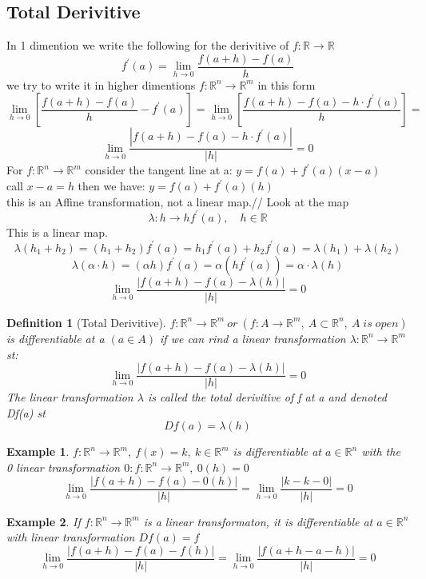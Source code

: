 \documentclass[12pt]{article}
\def\RR{\mathbb{R}}
\newtheorem{definition}{Definition}[section]
\newtheorem{example}{Example}[section]
\begin{document}
\subsection{Total Derivitive}


In 1 dimention we write the following for the derivitive of $f:\RR \rightarrow \RR$
\[f^{'}(a)=\lim_{h \to 0}\frac{f(a+h) - f(a)}{h}\]
we try to write it in higher dimentions $f:\RR^{n} \rightarrow \RR^{m}$ in this form
\[\lim_{h \to 0}\left[\frac{f(a+h) - f(a)}{h} - f^{'}(a)\right]=\lim_{h \to 0}\left[\frac{f(a+h) - f(a) - h \cdot f^{'}(a)}{h}\right]=\] 
\[\lim_{h \to 0}\frac{|f(a+h) - f(a) - h \cdot f^{'}(a)|}{|h|} =0 \]
For $f:\RR^{n} \rightarrow \RR^{m}$ consider the tangent line at a: $y=f(a) +f^{'}(a)(x-a)$\\
call $x-a = h$ then we have: $y=f(a) +f^{'}(a)(h)$\\
this is an Affine transformation, not a linear map.//
Look at the map
\[\lambda:h \rightarrow hf^{'}(a), \quad h \in \RR\]
This is a linear map.
\[\lambda(h_{1} + h_{2})=(h_{1} + h_{2})f^{'}(a)= h_{1}f^{'}(a) + h_{2}f^{'}(a) =\lambda(h_{1}) + \lambda(h_{2})\]
\[\lambda(\alpha \cdot h)=(\alpha h)f^{'}(a)=\alpha(hf^{'}(a))=\alpha \cdot\lambda( h)\]
\[\lim_{h \to 0}\frac{|f(a+h) - f(a) - \lambda(h)|}{|h|} =0 \]

\begin{definition}[Total Derivitive]\label{D:Total Derivitive}
$f:\RR^{n} \rightarrow \RR^{m}\: or \:(f:A \rightarrow \RR^{m}, \: A \subset \RR^{n}, \:A\;is\;open)$
is differentiable at a $(a \in A)$ if we can rind a linear transformation $ \lambda:\RR^{n} \rightarrow \RR^{m}$ st:
\[\lim_{h \to 0}\frac{|f(a+h) - f(a) - \lambda(h)|}{|h|} =0 \]
The linear transformation $\lambda$ is called the total derivitive of f at a and denoted Df(a) st
\[Df(a)=\lambda(h)\] 
\end{definition}

\begin{example} 
$f:\RR^{n} \rightarrow \RR^{m}, \: f(x)=k, \: k \in\RR^{m} $ is differentiable at $a\in\RR^{n}$ with the 0 linear transformation $0:f:\RR^{n} \rightarrow \RR^{m}, \: 0(h)=0$
\[\lim_{h \to 0}\frac{|f(a+h) - f(a) - 0(h)|}{|h|} = \lim_{h \to 0}\frac{|k - k - 0|}{|h|}= 0 \]
\end{example}

\begin{example}
If $f:\RR^{n} \rightarrow \RR^{m}$ is a linear transformaton, it is differentiable at $a\in\RR^{n}$ with linear transformation $Df(a) = f$
\[\lim_{h \to 0}\frac{|f(a+h) - f(a) - f(h)|}{|h|}= \lim_{h \to 0}\frac{|f(a+h -a -h)|}{|h|} = 0\]
\end{example}
\end{document}
